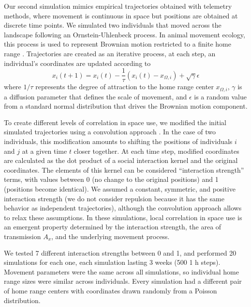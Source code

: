 \documentclass[letterpaper]{article}
\begin{document}
Our second simulation mimics empirical trajectories obtained with telemetry methods, where movement is continuous in space but positions are obtained at discrete time points. We simulated two individuals that moved across the landscape following an Ornstein-Uhlenbeck process. In animal movement ecology, this process is used to represent Brownian motion restricted to a finite home range \citep{Hooten2017a}. Trajectories are created as an iterative process, at each step, an individual's coordinates are updated according to %
\begin{equation}
	x_i(t+1)=x_i(t)-\frac{1}{\tau}(x_i(t)-x_{\Omega,i})+\sqrt{\gamma}\epsilon
\end{equation}
where $1/\tau$ represents the degree of attraction to the home range center $x_{\Omega,i}$, $\gamma$ is a diffusion parameter that defines the scale of movement, and $\epsilon$ is a random value from a standard normal distribution that drives the Brownian motion component. 

To create different levels of correlation in space use, we modified the initial simulated trajectories using a convolution approach \citep{Scharf2018}. In the case of two individuals, this modification amounts to shifting the positions of individuals $i$ and $j$ at a given time $t$ closer together. At each time step, modified coordinates are calculated as the dot product of a social interaction kernel and the original coordinates. The elements of this kernel can be considered ``interaction strength'' terms, with values between 0 (no change to the original positions) and 1 (positions become identical). We assumed a constant, symmetric, and positive interaction strength (we do not consider repulsion because it has the same behavior as independent trajectories), although the convolution approach allows to relax these assumptions. In these simulations, local correlation in space use is an emergent property determined by the interaction strength, the area of transmission $A_x$, and the underlying movement process. %

We tested 7 different interaction strengths between 0 and 1, and performed 20 simulations for each one, each simulation lasting 3 weeks (500 1 h steps). Movement parameters were the same across all simulations, so individual home range sizes were similar across individuals. Every simulation had a different pair of home range centers with coordinates drawn randomly from a Poisson distribution. %
\end{document}
